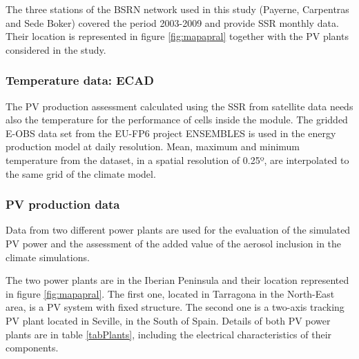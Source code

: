 The three stations of the BSRN network used in this study (Payerne, Carpentras and Sede Boker) covered the period 2003-2009 and provide SSR monthly data. Their location is represented in figure \ref{fig:mapapral} together with the PV plants considered in the study.  

\subsubsection{Temperature data: ECAD}

The PV production assessment calculated using the SSR from satellite data needs also the temperature for the performance of cells inside the module. The gridded E-OBS data set from the EU-FP6 project ENSEMBLES \citep{Haylock2008} is used in the energy production model at daily resolution. Mean, maximum and minimum temperature from the dataset, in a spatial resolution of 0.25º, are interpolated to the same grid of the climate model. 

\subsubsection{PV production data}

Data from two different power plants are used for the evaluation of the simulated PV power and the assessment of the added value of the aerosol inclusion in the climate simulations.

The two power plants are in the Iberian Peninsula and their location represented in figure \ref{fig:mapapral}. The first one, located in Tarragona in the North-East area, is a PV system with fixed structure. The second one is a two-axis tracking PV plant located in Seville, in the South of Spain. Details of both PV power plants are in table \ref{tabPlants}, including the electrical characteristics of their components. 

